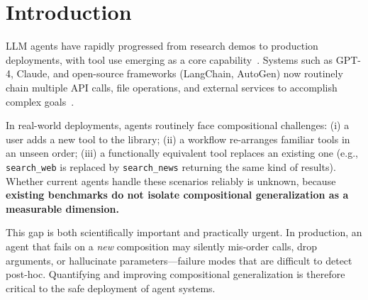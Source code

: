 ﻿\documentclass{article}
\begin{document}
\begin{abstract}
Our chain-aware training method, which augments training with synthetic compositional chains and overlays an {\bf equivalence-aware} variant detector, lifts substitutability from 0.250 (baseline) to 1.000 under equivalence-aware evaluation (a call to the expected tool or any functional equivalent counts as correct) and improves matched-length systematicity (3-tool: 0.75 vs 0.21 over template agents). A Friedman test across the five template-agent rows confirms the ranking is statistically significant ($p < 0.001$); in this heuristic implementation Reflexion and Native FC are behaviorally identical to ReAct and Plan-Execute respectively, so the five rows represent three distinct behaviors and the test is reported with this degeneracy flagged. a Critical Difference diagram visualizes the post-hoc grouping. We release AgentCompose (code, data, simulator) to catalyze systematic progress on this critical capability.
\end{abstract}

\section{Introduction}
\label{sec:intro}

LLM agents have rapidly progressed from research demos to production deployments, with tool use emerging as a core capability~\citep{schick2023toolformer, yao2023react, qin2023toolllm}. Systems such as GPT-4, Claude, and open-source frameworks (LangChain, AutoGen) now routinely chain multiple API calls, file operations, and external services to accomplish complex goals~\citep{liu2024agentbench, trivedi2024appworld, patil2024bfcl}.

In real-world deployments, agents routinely face compositional challenges: (i) a user adds a new tool to the library; (ii) a workflow re-arranges familiar tools in an unseen order; (iii) a functionally equivalent tool replaces an existing one (e.g., \texttt{search\_web} is replaced by \texttt{search\_news} returning the same kind of results). Whether current agents handle these scenarios reliably is unknown, because \textbf{existing benchmarks do not isolate compositional generalization as a measurable dimension.}

This gap is both scientifically important and practically urgent. In production, an agent that fails on a \emph{new} composition may silently mis-order calls, drop arguments, or hallucinate parameters---failure modes that are difficult to detect post-hoc. Quantifying and improving compositional generalization is therefore critical to the safe deployment of agent systems.
\end{document}

